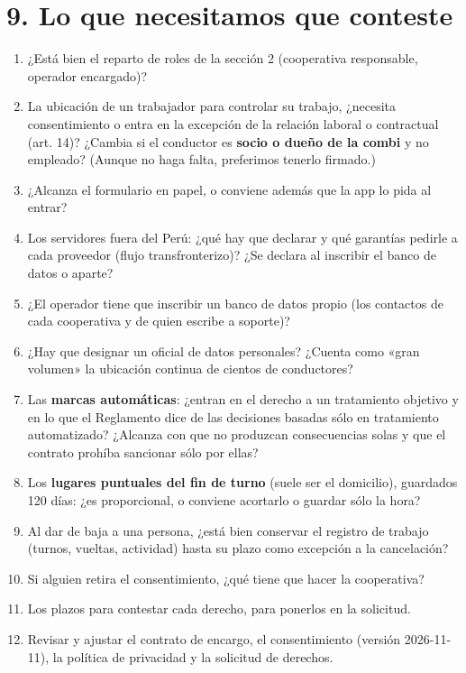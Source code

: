\documentclass[10.5pt,a4paper]{article}
\begin{document}
\section{9. Lo que necesitamos que conteste}
\begin{enumerate}[leftmargin=18pt,itemsep=4pt]
\item ¿Está bien el reparto de roles de la sección 2 (cooperativa
  responsable, operador encargado)?
\item La ubicación de un trabajador para controlar su trabajo, ¿necesita
  consentimiento o entra en la excepción de la relación laboral o
  contractual (art. 14)? ¿Cambia si el conductor es \textbf{socio o dueño de
  la combi} y no empleado? (Aunque no haga falta, preferimos tenerlo
  firmado.)
\item ¿Alcanza el formulario en papel, o conviene además que la app lo pida
  al entrar?
\item Los servidores fuera del Perú: ¿qué hay que declarar y qué garantías
  pedirle a cada proveedor (flujo transfronterizo)? ¿Se declara al inscribir
  el banco de datos o aparte?
\item ¿El operador tiene que inscribir un banco de datos propio (los
  contactos de cada cooperativa y de quien escribe a soporte)?
\item ¿Hay que designar un oficial de datos personales? ¿Cuenta como «gran
  volumen» la ubicación continua de cientos de conductores?
\item Las \textbf{marcas automáticas}: ¿entran en el derecho a un tratamiento
  objetivo y en lo que el Reglamento dice de las decisiones basadas sólo en
  tratamiento automatizado? ¿Alcanza con que no produzcan consecuencias solas
  y que el contrato prohíba sancionar sólo por ellas?
\item Los \textbf{lugares puntuales del fin de turno} (suele ser el domicilio),
  guardados 120 días: ¿es proporcional, o conviene acortarlo o guardar sólo
  la hora?
\item Al dar de baja a una persona, ¿está bien conservar el registro de trabajo
  (turnos, vueltas, actividad) hasta su plazo como excepción a la cancelación?
\item Si alguien retira el consentimiento, ¿qué tiene que hacer la cooperativa?
\item Los plazos para contestar cada derecho, para ponerlos en la solicitud.
\item Revisar y ajustar el contrato de encargo, el consentimiento (versión
  2026-11-11), la política de privacidad y la solicitud de derechos.
\end{enumerate}
\end{document}
